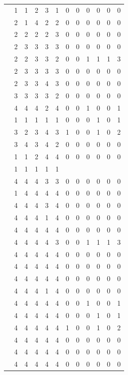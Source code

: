 \documentclass[]{msu-thesis}
\theoremstyle{definition}
\theoremstyle{definition}
\theoremstyle{definition}
\theoremstyle{remark}
\begin{document}
\begin{table}
{\begin{tabular}[t]{rrrrrrrrrrrr}
 & 1 & 1 & 2 & 3 & 1 & 0 & 0 & 0 & 0 & 0 & 0\\
 & 2 & 1 & 4 & 2 & 2 & 0 & 0 & 0 & 0 & 0 & 0\\
 & 2 & 2 & 2 & 2 & 3 & 0 & 0 & 0 & 0 & 0 & 0\\
 & 2 & 3 & 3 & 3 & 3 & 0 & 0 & 0 & 0 & 0 & 0\\
 & 2 & 2 & 3 & 3 & 2 & 0 & 0 & 1 & 1 & 1 & 3\\
 & 2 & 3 & 3 & 3 & 3 & 0 & 0 & 0 & 0 & 0 & 0\\
 & 2 & 3 & 3 & 4 & 3 & 0 & 0 & 0 & 0 & 0 & 0\\
 & 3 & 3 & 3 & 3 & 2 & 0 & 0 & 0 & 0 & 0 & 0\\
 & 4 & 4 & 4 & 2 & 4 & 0 & 0 & 1 & 0 & 0 & 1\\
 & 1 & 1 & 1 & 1 & 1 & 0 & 0 & 0 & 1 & 0 & 1\\
 & 3 & 2 & 3 & 4 & 3 & 1 & 0 & 0 & 1 & 0 & 2\\
 & 3 & 4 & 3 & 4 & 2 & 0 & 0 & 0 & 0 & 0 & 0\\
 & 1 & 1 & 2 & 4 & 4 & 0 & 0 & 0 & 0 & 0 & 0\\
 & 1 & 1 & 1 & 1 & 1 &  &  &  &  &  & \\
 & 4 & 4 & 4 & 3 & 3 & 0 & 0 & 0 & 0 & 0 & 0\\
 & 1 & 4 & 4 & 4 & 4 & 0 & 0 & 0 & 0 & 0 & 0\\
 & 4 & 4 & 4 & 3 & 4 & 0 & 0 & 0 & 0 & 0 & 0\\
 & 4 & 4 & 4 & 1 & 4 & 0 & 0 & 0 & 0 & 0 & 0\\
 & 4 & 4 & 4 & 4 & 4 & 0 & 0 & 0 & 0 & 0 & 0\\
 & 4 & 4 & 4 & 4 & 3 & 0 & 0 & 1 & 1 & 1 & 3\\
 & 4 & 4 & 4 & 4 & 4 & 0 & 0 & 0 & 0 & 0 & 0\\
 & 4 & 4 & 4 & 4 & 4 & 0 & 0 & 0 & 0 & 0 & 0\\
 & 4 & 4 & 4 & 4 & 4 & 0 & 0 & 0 & 0 & 0 & 0\\
 & 4 & 4 & 4 & 1 & 4 & 0 & 0 & 0 & 0 & 0 & 0\\
 & 4 & 4 & 4 & 4 & 4 & 0 & 0 & 1 & 0 & 0 & 1\\
 & 4 & 4 & 4 & 4 & 4 & 0 & 0 & 0 & 1 & 0 & 1\\
 & 4 & 4 & 4 & 4 & 4 & 1 & 0 & 0 & 1 & 0 & 2\\
 & 4 & 4 & 4 & 4 & 4 & 0 & 0 & 0 & 0 & 0 & 0\\
 & 4 & 4 & 4 & 4 & 4 & 0 & 0 & 0 & 0 & 0 & 0\\
 & 4 & 4 & 4 & 4 & 4 & 0 & 0 & 0 & 0 & 0 & 0\\

\end{tabular}}
\end{table}
\end{document}
